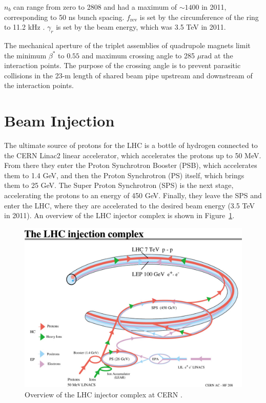 \documentclass[dissertation.tex]{subfiles}
\begin{document}
$n_{b}$ can range from zero to 2808 and had a maximum of $\sim1400$ in 2011, corresponding to 50 ns bunch spacing.  $f_{\mathrm{rev}}$ is set by the circumference of the ring to 11.2 kHz \cite{Bruning:782076}.  $\gamma_{r}$ is set by the beam energy, which was 3.5 TeV in 2011.

The mechanical aperture of the triplet assemblies of quadrupole magnets limit the minimum $\beta^{*}$ to $0.55$ \cite{Bruning:782076} and maximum crossing angle to 285 $\mu\mbox{rad}$ \cite{Bruning:782076} at the interaction points.  The purpose of the crossing angle is to prevent parasitic collisions in the 23-m length of shared beam pipe upstream and downstream of the interaction points.

\section{Beam Injection}
\label{sec:Beam Injection}

The ultimate source of protons for the LHC is a bottle of hydrogen connected to the CERN Linac2 linear accelerator, which accelerates the protons up to 50 MeV.  From there they enter the Proton Synchrotron Booster (PSB), which accelerates them to 1.4 GeV, and then the Proton Synchrotron (PS) itself, which brings them to 25 GeV.  The Super Proton Synchrotron (SPS) is the next stage, accelerating the protons to an energy of 450 GeV.  Finally, they leave the SPS and enter the LHC, where they are accelerated to the desired beam energy (3.5 TeV in 2011).  An overview of the LHC injector complex is shown in Figure~\ref{fig:LHC_injector_complex}.

\begin{figure}
	\centering
	\includegraphics[scale=0.4]{LHC_injector_complex}
	\caption{Overview of the LHC injector complex at CERN \cite{LHC_injector_complex_photo}.}
	\label{fig:LHC_injector_complex}
\end{figure}
\end{document}
